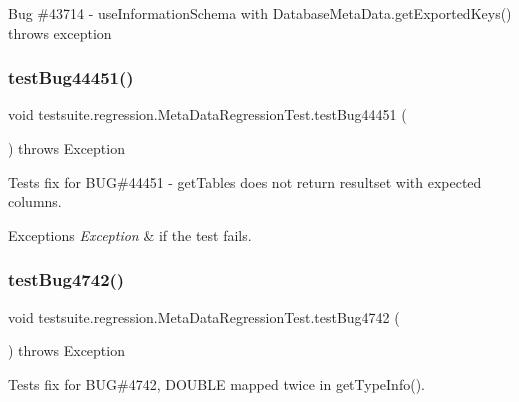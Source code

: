 Bug \#43714 -\/ use\+Information\+Schema with Database\+Meta\+Data.\+get\+Exported\+Keys() throws exception \mbox{\label{classtestsuite_1_1regression_1_1_meta_data_regression_test_ad048c86a8dc4f574eae4004473ceaa6f}} 
\subsubsection{\texorpdfstring{test\+Bug44451()}{testBug44451()}}
{\footnotesize\ttfamily void testsuite.\+regression.\+Meta\+Data\+Regression\+Test.\+test\+Bug44451 (\begin{DoxyParamCaption}{ }\end{DoxyParamCaption}) throws Exception}

Tests fix for B\+UG\#44451 -\/ get\+Tables does not return resultset with expected columns.


\begin{DoxyExceptions}{Exceptions}
{\em Exception} & if the test fails. \\
\hline
\end{DoxyExceptions}
\mbox{\label{classtestsuite_1_1regression_1_1_meta_data_regression_test_aacb167d12465f3fad1e2723a82c2300e}} 
\subsubsection{\texorpdfstring{test\+Bug4742()}{testBug4742()}}
{\footnotesize\ttfamily void testsuite.\+regression.\+Meta\+Data\+Regression\+Test.\+test\+Bug4742 (\begin{DoxyParamCaption}{ }\end{DoxyParamCaption}) throws Exception}

Tests fix for B\+UG\#4742, \textquotesingle{}D\+O\+U\+B\+LE\textquotesingle{} mapped twice in get\+Type\+Info().


